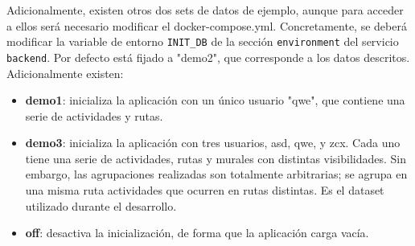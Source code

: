 Adicionalmente, existen otros dos sets de datos de ejemplo, aunque para acceder a ellos será necesario modificar el docker-compose.yml. Concretamente, se deberá modificar la variable de entorno \texttt{INIT\_DB} de la sección \texttt{environment} del servicio \texttt{backend}. Por defecto está fijado a "demo2", que corresponde a los datos descritos. Adicionalmente existen:
\begin{itemize}
    \item \textbf{demo1}: inicializa la aplicación con un único usuario "qwe", que contiene una serie de actividades y rutas.
    \item \textbf{demo3}: inicializa la aplicación con tres usuarios, asd, qwe, y zcx. Cada uno tiene una serie de actividades, rutas y murales con distintas visibilidades. Sin embargo, las agrupaciones realizadas son totalmente arbitrarias; se agrupa en una misma ruta actividades que ocurren en rutas distintas. Es el dataset utilizado durante el desarrollo.
    \item \textbf{off}: desactiva la inicialización, de forma que la aplicación carga vacía.
\end{itemize}

